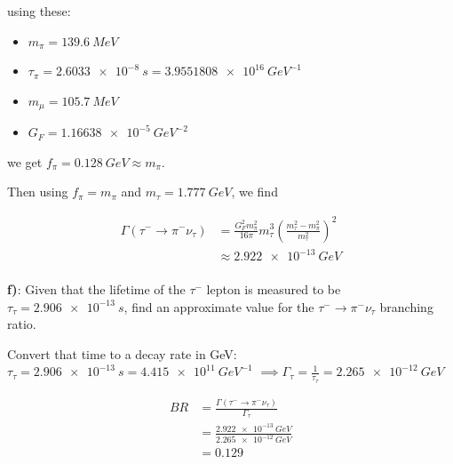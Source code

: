 using these:
\begin{itemize}
    \item $m_\pi = \SI{139.6}{MeV}$
    \item $\tau_\pi = \SI{2.6033e-8}{s} = \SI{3.9551808e16}{GeV^{-1}}$
    \item $m_\mu = \SI{105.7}{MeV}$
    \item $G_F=\SI{1.16638e-5}{GeV^{-2}}$
\end{itemize}
we get $f_\pi = \SI{0.128}{GeV} \approx m_\pi$.

Then using $f_\pi = m_\pi$ and $m_\tau = \SI{1.777}{GeV}$, we find

\begin{align*}
    \Gamma(\tau^- \to \pi^- \nu_\tau)
    &= \frac{G_F^2 m_\pi^2}{16\pi} m_\tau^3 \left(\frac{m_\tau^2 - m_\pi^2}{m_\tau^2}\right)^2 \\
    &\approx \SI{2.922e-13}{GeV} \\
\end{align*}

\textbf{f)}: Given that the lifetime of the $\tau^-$ lepton is measured to be $\tau_\tau = \SI{2.906e-13}{s}$, find an approximate value for the $\tau^- \to \pi^- \nu_\tau$ branching ratio.

Convert that time to a decay rate in GeV: $\tau_\tau = \SI{2.906e-13}{s} = \SI{4.415e11}{GeV^{-1}}$ $\implies \Gamma_\tau = \frac{1}{\tau_\tau} = \SI{2.265e-12}{GeV}$

\begin{align*}
    BR &= \frac{\Gamma(\tau^- \to \pi^- \nu_\tau)}{\Gamma_\tau} \\
    &= \frac{\SI{2.922e-13}{GeV}}{\SI{2.265e-12}{GeV}} \\
    &= 0.129 \\
\end{align*}
